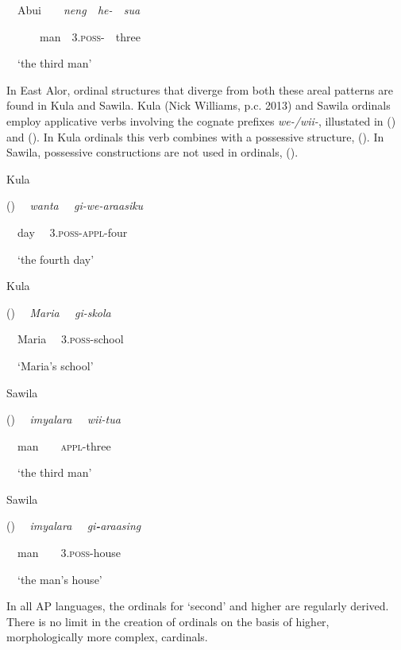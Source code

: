 \ \ Abui\ \ \ \ \textit{neng\ \ he-\ \ sua}

\ \ \ \ \ \ man\ \ 3\textsc{.poss-\ \ }three

\ \ {\textquoteleft}the third man{\textquoteright}

In East Alor, ordinal structures that diverge from both these areal patterns are found in Kula and Sawila. Kula (Nick Williams, p.c. 2013) and Sawila ordinals employ applicative verbs involving the cognate prefixes \textit{we-/wii-}, illustated in () and (). In Kula ordinals this verb combines with a possessive structure, (). In Sawila, possessive constructions  are not used in ordinals, (). 

Kula

\label{bkm:Ref355275027}()  \ \ \textit{wanta \ \ gi-we-araasiku}

\ \ day \ \ 3.\textsc{poss}{}-\textsc{appl}{}-four

\ \ {\textquoteleft}the fourth day{\textquoteright}

Kula

\label{bkm:Ref358037937}() \ \ \textit{Maria \ \ gi-skola}

\ \ Maria \ \ 3.\textsc{poss-}school

\ \ {\textquoteleft}Maria{\textquoteright}s school{\textquoteright}

Sawila

\label{bkm:Ref355277550}()  \ \ \textit{imyalara \ \ wii-tua}

\ \ man\ \ \ \ \textsc{appl-}three

\ \ {\textquoteleft}the third man{\textquoteright}

Sawila\ \ 

\label{bkm:Ref342737790}()  \ \ \textit{imyalara \ \ gi}\textbf{\textit{{}-}}\textit{araasing}

\ \ man\ \ \ \ 3.\textsc{poss-}house\ \ \ \ 

\ \ {\textquoteleft}the man{\textquoteright}s house{\textquoteright}

In all AP languages, the ordinals for {\textquoteleft}second{\textquoteright} and higher are regularly derived. There is no limit in the creation of ordinals on the basis of higher, morphologically more complex, cardinals.


